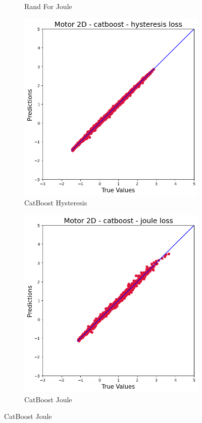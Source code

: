 \documentclass{article}
\begin{document}
\begin{figure}[!htbp]
\begin{subfigure}[b]{0.23\textwidth}
        \caption{Rand For Joule}
    \end{subfigure}
    \hfill
    \begin{subfigure}[b]{0.23\textwidth}
        \centering
        \includegraphics[width=\textwidth]{images/2D/catboost_hysteresis.png}
        \caption{CatBoost Hysteresis}
    \end{subfigure}
    \hfill
    \begin{subfigure}[b]{0.23\textwidth}
        \centering
        \includegraphics[width=\textwidth]{images/2D/catboost_joule.png}
        \caption{CatBoost Joule}
    \end{subfigure}
    

\end{figure}
\end{document}
